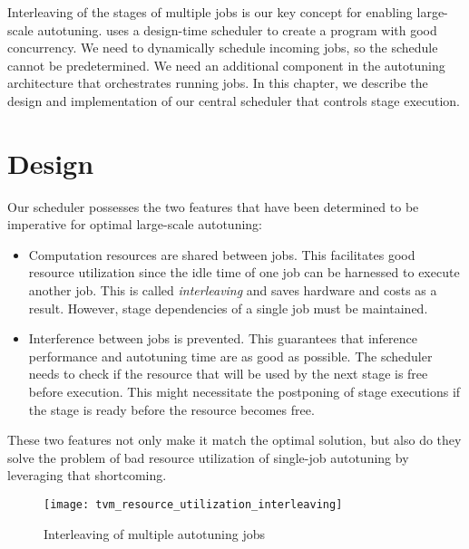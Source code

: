 Interleaving of the stages of multiple jobs is our key concept for enabling large-scale autotuning. \cite{Ma.2005} uses a design-time scheduler to create a program with good concurrency. We need to dynamically schedule incoming jobs, so the schedule cannot be predetermined. We need an additional component in the autotuning architecture that orchestrates running jobs. In this chapter, we describe the design and implementation of our central scheduler that controls stage execution.

\section{Design}
Our scheduler possesses the two features that have been determined to be imperative for optimal large-scale autotuning:
\begin{itemize}
	\item Computation resources are shared between jobs. This facilitates good resource utilization since the idle time of one job can be harnessed to execute another job. This is called \textit{interleaving} and saves hardware and costs as a result. However, stage dependencies of a single job must be maintained.
	\item Interference between jobs is prevented. This guarantees that inference performance and autotuning time are as good as possible. The scheduler needs to check if the resource that will be used by the next stage is free before execution. This might necessitate the postponing of stage executions if the stage is ready before the resource becomes free.
\end{itemize}
These two features not only make it match the optimal solution, but also do they solve the problem of bad resource utilization of single-job autotuning by leveraging that shortcoming.

\begin{figure}[h]
	\centering
	\texttt{[image: tvm\_resource\_utilization\_interleaving]}%
	\caption{Interleaving of multiple autotuning jobs}
	\label{fig:interleaving}
\end{figure}

